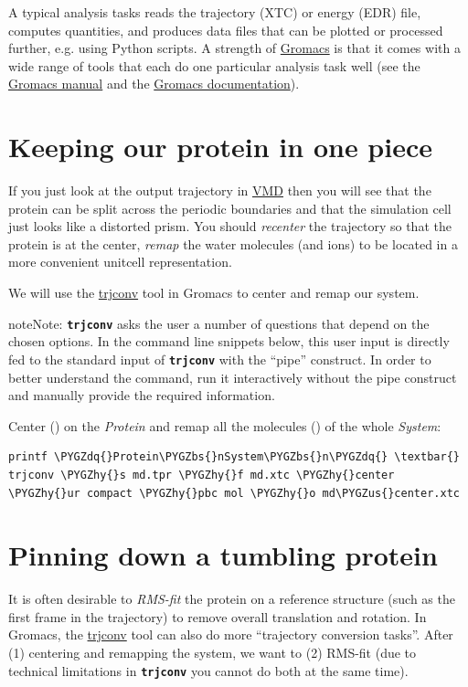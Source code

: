 \documentclass[letterpaper,10pt,english]{sphinxmanual}
\def\PYGZbs{\char`\\}
\def\PYGZus{\char`\_}
\def\PYGZhy{\char`\-}
\def\PYGZdq{\char`\"}
\begin{document}
A typical analysis tasks reads the trajectory (XTC) or energy (EDR)
file, computes quantities, and produces data files that can be plotted
or processed further, e.g. using Python scripts. A strength of
\href{http://www.gromacs.org}{Gromacs} is that it comes with a wide range of tools that each do one
particular analysis task well (see the \href{http://manual.gromacs.org/}{Gromacs manual} and the
\href{http://www.gromacs.org/Documentation}{Gromacs documentation}).


\section{Keeping our protein in one piece}
\label{trajectory_visualization:keeping-our-protein-in-one-piece}
If you just look at the output trajectory  in \href{http://www.ks.uiuc.edu/Research/vmd/}{VMD} then
you will see that the protein can be split across the periodic
boundaries and that the simulation cell just looks like a distorted
prism. You should \emph{recenter} the trajectory so that the protein is at
the center, \emph{remap} the water molecules (and ions) to be located in a
more convenient unitcell representation.

We will use the \href{http://manual.gromacs.org/current/online/trjconv.html}{trjconv} tool in Gromacs to center and remap our system.

\begin{notice}{note}{Note:}
\textbf{\texttt{trjconv}} asks the user a number of
questions that depend on the chosen options. In the command line
snippets below, this user input is directly fed to the standard input
of \textbf{\texttt{trjconv}} with the  ``pipe''
construct. In order to better understand the command, run it
interactively without the pipe construct and manually provide the
required information.
\end{notice}

Center () on the \emph{Protein} and remap all the molecules
() of the whole \emph{System}:

\begin{Verbatim}[commandchars=\\\{\}]
printf \PYGZdq{}Protein\PYGZbs{}nSystem\PYGZbs{}n\PYGZdq{} \textbar{} trjconv \PYGZhy{}s md.tpr \PYGZhy{}f md.xtc \PYGZhy{}center \PYGZhy{}ur compact \PYGZhy{}pbc mol \PYGZhy{}o md\PYGZus{}center.xtc
\end{Verbatim}


\section{Pinning down a tumbling protein}
\label{trajectory_visualization:pinning-down-a-tumbling-protein}
It is often desirable to \emph{RMS-fit} the protein on a reference structure
(such as the first frame in the trajectory) to remove overall translation
and rotation. In Gromacs, the \href{http://manual.gromacs.org/current/online/trjconv.html}{trjconv} tool can also do more ``trajectory
conversion tasks''. After (1) centering and remapping the system, we want
to (2) RMS-fit (due to technical limitations in \textbf{\texttt{trjconv}} you
cannot do both at the same time).
\end{document}
